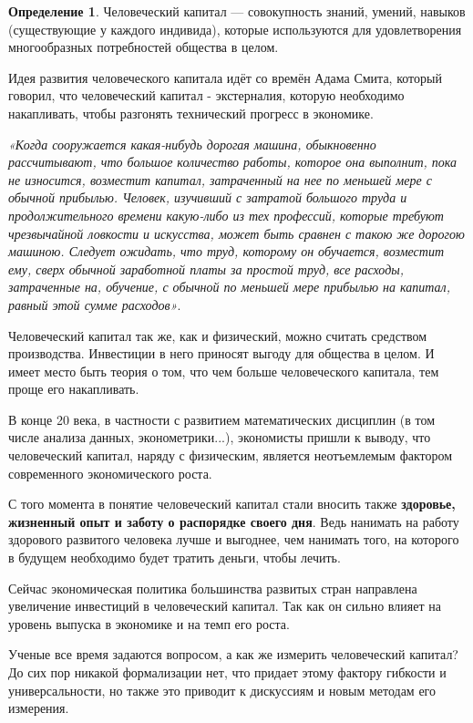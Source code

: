 \documentclass[reqno]{article}
\theoremstyle{definition}
\theoremstyle{definition}
\theoremstyle{definition}
\theoremstyle{definition}
\theoremstyle{definition}
\theoremstyle{definition}
\theoremstyle{definition}
\newtheorem*{defi}{Определение}
\theoremstyle{definition}
\theoremstyle{definition}
\begin{document}
			\begin{defi}
				Человеческий капитал — совокупность знаний, умений, навыков (существующие у каждого индивида), которые используются для удовлетворения многообразных потребностей общества в целом.
			\end{defi}
			
			Идея развития человеческого капитала идёт со времён Адама Смита, который говорил, что человеческий капитал - экстерналия, которую необходимо накапливать, чтобы разгонять технический прогресс в экономике.
			
			\begin{center}
				\emph{«Когда сооружается какая-нибудь дорогая машина, обыкновенно рассчитывают, что большое количество работы, которое она выполнит, пока не износится, возместит капитал, затраченный на нее по меньшей мере с обычной прибылью. Человек, изучивший с затратой большого труда и продолжительного времени какую-либо из тех профессий, которые требуют чрезвычайной ловкости и искусства, может быть сравнен с такою же дорогою машиною. Следует ожидать, что труд, которому он обучается, возместит ему, сверх обычной заработной платы за простой труд, все расходы, затраченные на, обучение, с обычной по меньшей мере прибылью на капитал, равный этой сумме расходов»}.
			\end{center}
			
			Человеческий капитал так же, как и физический, можно считать средством производства. Инвестиции в него приносят выгоду для общества в целом. И имеет место быть теория о том, что чем больше человеческого капитала, тем проще его накапливать. 
			
			В конце 20 века, в частности с развитием математических дисциплин (в том числе анализа данных, эконометрики...), экономисты пришли к выводу, что человеческий капитал, наряду с физическим, является неотъемлемым фактором современного экономического роста.
			
			С того момента в понятие человеческий капитал стали вносить также \textbf{здоровье, жизненный опыт и заботу о распорядке своего дня}. Ведь нанимать на работу здорового развитого человека лучше и выгоднее, чем нанимать того, на которого в будущем необходимо будет тратить деньги, чтобы лечить.
			
			Сейчас экономическая политика большинства развитых стран направлена увеличение инвестиций в человеческий капитал. Так как он сильно влияет на уровень выпуска в экономике и на темп его роста.  
			
			Ученые все время задаются вопросом, а как же измерить человеческий капитал? До сих пор никакой формализации нет, что придает этому фактору гибкости и универсальности, но также это приводит к дискуссиям и новым методам его измерения. 
		
\end{document}
